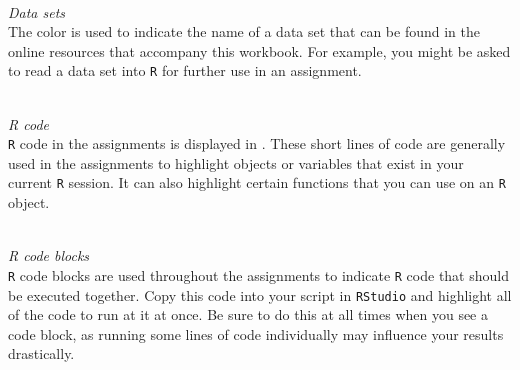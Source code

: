  \\ 

\bigskip

\textit{Data sets} \\

The color  is used to indicate the name of a data set that can be found in the online resources that accompany this workbook. For example, you might be asked to read a data set into \texttt{R} for further use in an assignment. \\

 \\

\bigskip 

\textit{R code} \\ 

\texttt{R} code in the assignments is displayed in . These short lines of code are generally used in the assignments to highlight objects or variables that exist in your current \texttt{R} session. It can also highlight certain functions that you can use on an \texttt{R} object. \\

 \\ 

\bigskip

\textit{R code blocks} \\ 

\texttt{R} code blocks are used throughout the assignments to indicate \texttt{R} code that should be executed together. Copy this code into your script in \texttt{RStudio} and highlight all of the code to run at it at once. Be sure to do this at all times when you see a code block, as running some lines of code individually may influence your results drastically. \\


\clearpage %

